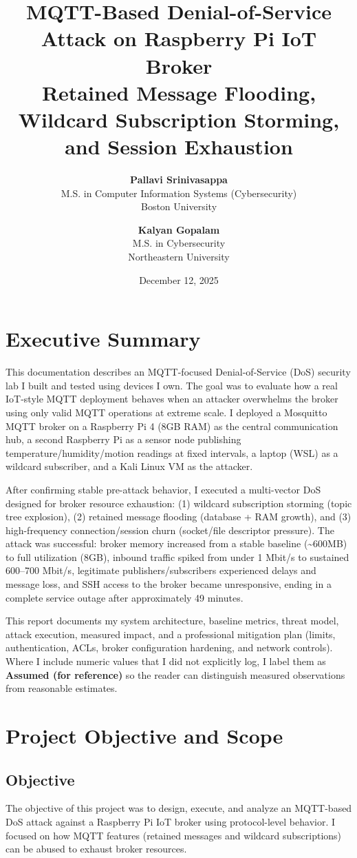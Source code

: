 \documentclass[11pt]{article}
\title{\textbf{MQTT-Based Denial-of-Service Attack on Raspberry Pi IoT Broker}\\
\large Retained Message Flooding, Wildcard Subscription Storming, and Session Exhaustion}
\author{%
\textbf{Pallavi Srinivasappa}\\
M.S. in Computer Information Systems (Cybersecurity)\\
Boston University
\and
\textbf{Kalyan Gopalam}\\
M.S. in Cybersecurity\\
Northeastern University
}
\date{December 12, 2025}
\begin{document}
\maketitle

\section{Executive Summary}
This documentation describes an MQTT-focused Denial-of-Service (DoS) security lab I built and tested using devices I own. The goal was to evaluate how a real IoT-style MQTT deployment behaves when an attacker overwhelms the broker using only valid MQTT operations at extreme scale. I deployed a Mosquitto MQTT broker on a Raspberry Pi 4 (8GB RAM) as the central communication hub, a second Raspberry Pi as a sensor node publishing temperature/humidity/motion readings at fixed intervals, a laptop (WSL) as a wildcard subscriber, and a Kali Linux VM as the attacker.

After confirming stable pre-attack behavior, I executed a multi-vector DoS designed for broker resource exhaustion:
(1) wildcard subscription storming (topic tree explosion),
(2) retained message flooding (database + RAM growth),
and (3) high-frequency connection/session churn (socket/file descriptor pressure).
The attack was successful: broker memory increased from a stable baseline (\textasciitilde600MB) to full utilization (8GB), inbound traffic spiked from under 1 Mbit/s to sustained 600--700 Mbit/s, legitimate publishers/subscribers experienced delays and message loss, and SSH access to the broker became unresponsive, ending in a complete service outage after approximately 49 minutes.

This report documents my system architecture, baseline metrics, threat model, attack execution, measured impact, and a professional mitigation plan (limits, authentication, ACLs, broker configuration hardening, and network controls). Where I include numeric values that I did not explicitly log, I label them as \textbf{Assumed (for reference)} so the reader can distinguish measured observations from reasonable estimates.

\section{Project Objective and Scope}
\subsection{Objective}
The objective of this project was to design, execute, and analyze an MQTT-based DoS attack against a Raspberry Pi IoT broker using protocol-level behavior. I focused on how MQTT features (retained messages and wildcard subscriptions) can be abused to exhaust broker resources.
\end{document}
